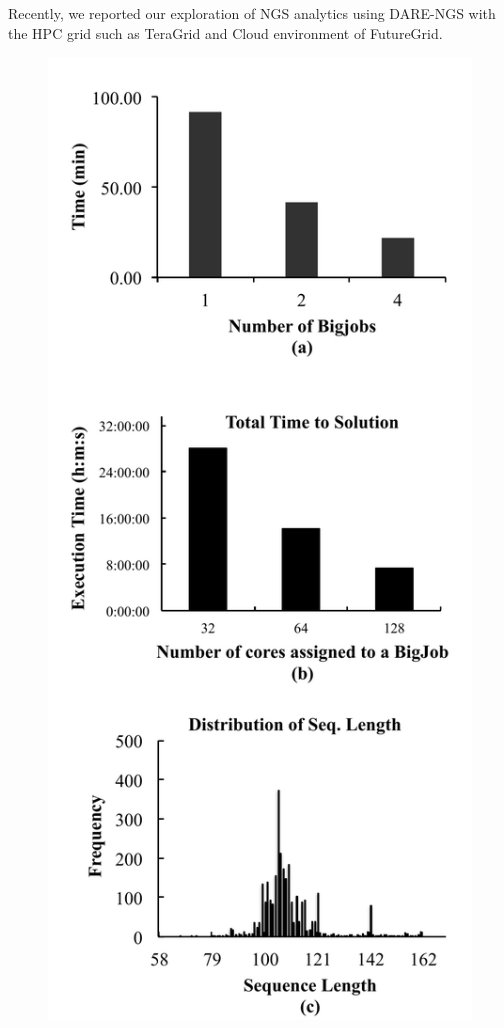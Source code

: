 \documentclass{sig-alternate}
\begin{document}
Recently, we reported our exploration of NGS analytics using DARE-NGS with the HPC grid such as TeraGrid and
Cloud environment of FutureGrid\cite{ecmls11}. 



\begin{figure}
 \centering
\includegraphics[scale=0.40]{figures/dare-rfold-result.pdf}

\end{figure}
\end{document}
